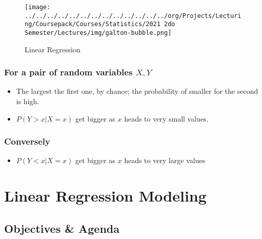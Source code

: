 \documentclass[10pt,article]{article}
\begin{document}
\begin{figure}[htbp]
\centering
\texttt{[image: ../../../../../../../../../../../../../org/Projects/Lecturing/Coursepack/Courses/Statistics/2021 2do Semester/Lectures/img/galton-bubble.png]}
\caption{\label{fig:multivariate}Linear Regression}
\end{figure}

\subsubsection{For a pair of random variables \(X,Y\)}
\label{sec:org86948d8}
\begin{itemize}
\item The largest the first one, by chance; the probability of smaller for the second is high.

\item \(P(Y > x|X=x)\) get bigger as \(x\) heads to very small values.
\end{itemize}

\subsubsection{Conversely}
\label{sec:org2926e9c}
\begin{itemize}
\item \(P(Y < x|X=x)\) get bigger as \(x\) heads to very large values
\end{itemize}
\section{Linear Regression Modeling}
\label{sec:orgcc97bdb}
\subsection{Objectives \& Agenda}
\label{RegModelsAgenda}
\end{document}
